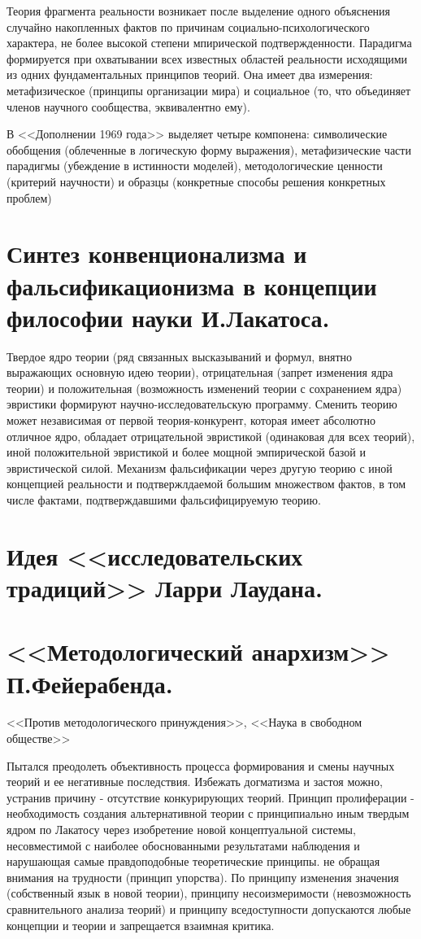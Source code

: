 \documentclass[12pt, specialist, subf, substylefile = spbu.rtx]{disser}
\begin{document}
Теория фрагмента реальности возникает после выделение одного объяснения случайно накопленных фактов по причинам социально-психологического характера, не более высокой степени мпирической подтвержденности. Парадигма формируется при охватывании всех известных областей реальности исходящими из одних фундаментальных принципов теорий. Она имеет два измерения: метафизическое (принципы организации мира) и социальное (то, что объединяет членов научного сообщества, эквивалентно ему). 

В <<Дополнении 1969 года>> выделяет четыре компонена: символические обобщения (облеченные в логическую форму выражения), метафизические части парадигмы (убеждение в истинности моделей), методологические ценности (критерий научности) и образцы (конкретные способы решения конкретных проблем)



\section{Синтез конвенционализма и фальсификационизма в концепции философии науки И.Лакатоса.}
Твердое ядро теории (ряд связанных высказываний и формул, внятно выражающих основную идею теории), отрицательная (запрет изменения ядра теории) и положительная (возможность изменений теории с сохранением ядра) эвристики формируют научно-исследовательскую программу.
Сменить теорию может независимая от первой теория-конкурент, которая имеет абсолютно отличное ядро, обладает отрицательной эвристикой (одинаковая для всех теорий), иной положительной эвристикой и более мощной эмпирической базой и эвристической силой.
Механизм фальсификации через другую теорию с иной концепцией реальности и подтвержлдаемой большим множеством фактов, в том числе фактами, подтверждавшими фальсифицируемую теорию.


\section{Идея <<исследовательских традиций>> Ларри Лаудана.}

\section{<<Методологический анархизм>> П.Фейерабенда.}
<<Против методологического принуждения>>,  <<Наука в свободном обществе>>

Пытался преодолеть объективность процесса формирования и смены научных теорий и ее негативные последствия. Избежать догматизма и застоя можно, устранив причину - отсутствие конкурирующих теорий. Принцип пролиферации - необходимость создания альтернативной теории с принципиально иным твердым ядром по Лакатосу через изобретение новой концептуальной системы, несовместимой с наиболее обоснованными результатами наблюдения и нарушающая самые правдоподобные теоретические принципы. не обращая внимания на трудности (принцип упорства). По принципу изменения значения (собственный язык в новой теории), принципу несоизмеримости (невозможность сравнительного анализа теорий) и принципу вседоступности допускаются любые концепции и теории и запрещается взаимная критика.
\end{document}
